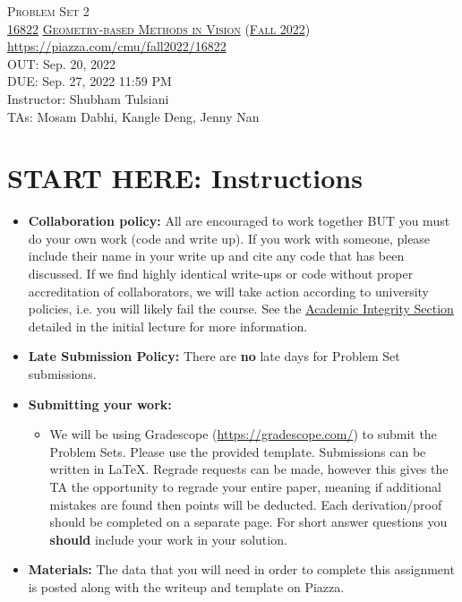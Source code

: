 \documentclass[11pt,addpoints,answers]{exam}
\title{\textsc{\hwName}} %
\author{}
\date{}
\date{}
\numberwithin{equation}{section} %
\numberwithin{figure}{section} %
\numberwithin{table}{section} %
\newcommand{\courseNum}{\href{https://geometric3d.github.io}{16822}}
\newcommand{\courseName}{\href{https://geometric3d.github.io}{Geometry-based Methods in Vision}}
\newcommand{\courseSem}{\href{https://geometric3d.github.io}{Fall 2022}}
\newcommand{\courseUrl}{\url{https://piazza.com/cmu/fall2022/16822}}
\newcommand{\hwNum}{Problem Set 2}
\newcommand{\hwTopic}{Projective Geometry and Homography }
\newcommand{\outDate}{Sep. 20, 2022}
\newcommand{\dueDate}{Sep. 27, 2022 11:59 PM}
\newcommand{\instructorName}{Shubham Tulsiani}
\newcommand{\taNames}{Mosam Dabhi, Kangle Deng, Jenny Nan}
\begin{document}
\section*{}
\begin{center}
  \textsc{\LARGE \hwNum} \\
  \vspace{1em}
  \textsc{\large \courseNum{} \courseName{} (\courseSem)} \\
  \courseUrl\\
  \vspace{1em}
  OUT: \outDate \\
  DUE: \dueDate \\
  Instructor: \instructorName \\
  TAs: \taNames
\end{center}

\section*{START HERE: Instructions}
\begin{itemize}
\item \textbf{Collaboration policy:} All are encouraged to work together BUT you must do your own work (code and write up). If you work with someone, please include their name in your write up and cite any code that has been discussed. If we find highly identical write-ups or code without proper accreditation of collaborators, we will take action according to university policies, i.e. you will likely fail the course. See the \href{https://www.dropbox.com/s/z6o0tinc9eaez46/L01_Overview.pdf?dl=0}{Academic Integrity Section} detailed in the initial lecture for more information.

\item\textbf{Late Submission Policy:} There are \textbf{no} late days for Problem Set submissions.

\item\textbf{Submitting your work:}

\begin{itemize}

\item We will be using Gradescope (\url{https://gradescope.com/}) to submit the Problem Sets. Please use the provided template. Submissions can be written in LaTeX. Regrade requests can be made, however this gives the TA the opportunity to regrade your entire paper, meaning if additional mistakes are found then points will be deducted.
Each derivation/proof should be  completed on a separate page. For short answer questions you \textbf{should} include your work in your solution.  
\end{itemize}

\item \textbf{Materials:} The data that you will need in order to complete this assignment is posted along with the writeup and template on Piazza.

\end{itemize}
\end{document}
